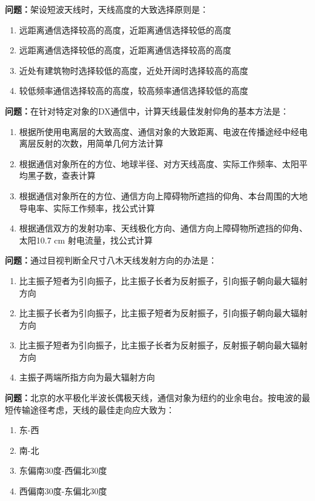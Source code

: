 \bigskip


\noindent\textbf{问题：}架设短波天线时，天线高度的大致选择原则是：
\begin{enumerate}[label=\Alph*), leftmargin=3em]
\item 远距离通信选择较高的高度，近距离通信选择较低的高度
\item 远距离通信选择较低的高度，近距离通信选择较高的高度
\item 近处有建筑物时选择较低的高度，近处开阔时选择较高的高度
\item 较低频率通信选择较高的高度，较高频率通信选择较低的高度
\end{enumerate}

\bigskip


\noindent\textbf{问题：}在针对特定对象的DX通信中，计算天线最佳发射仰角的基本方法是：
\begin{enumerate}[label=\Alph*), leftmargin=3em]
\item 根据所使用电离层的大致高度、通信对象的大致距离、电波在传播途经中经电离层反射的次数，用简单几何方法计算
\item 根据通信对象所在的方位、地球半径、对方天线高度、实际工作频率、太阳平均黑子数，查表计算
\item 根据通信对象所在的方位、通信方向上障碍物所遮挡的仰角、本台周围的大地导电率、实际工作频率，找公式计算
\item 根据通信双方的发射功率、天线极化方向、通信方向上障碍物所遮挡的仰角、太阳10.7 cm 射电流量，找公式计算
\end{enumerate}

\bigskip


\noindent\textbf{问题：}通过目视判断全尺寸八木天线发射方向的办法是：
\begin{enumerate}[label=\Alph*), leftmargin=3em]
\item 比主振子短者为引向振子，比主振子长者为反射振子，引向振子朝向最大辐射方向
\item 比主振子长者为引向振子，比主振子短者为反射振子，引向振子朝向最大辐射方向
\item 比主振子短者为引向振子，比主振子长者为反射振子，反射振子朝向最大辐射方向
\item 主振子两端所指方向为最大辐射方向
\end{enumerate}

\bigskip


\noindent\textbf{问题：}北京的水平极化半波长偶极天线，通信对象为纽约的业余电台。按电波的最短传输途径考虑，天线的最佳走向应大致为：
\begin{enumerate}[label=\Alph*), leftmargin=3em]
\item 东-西
\item 南-北
\item 东偏南30度-西偏北30度
\item 西偏南30度-东偏北30度
\end{enumerate}

